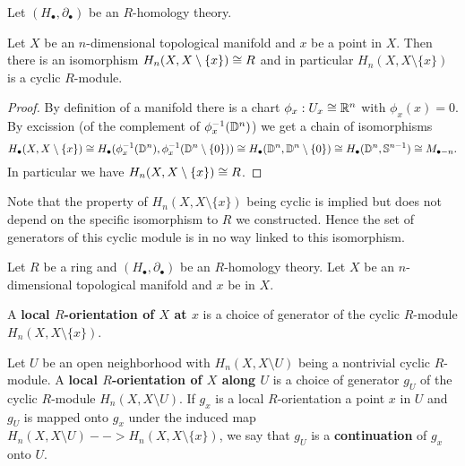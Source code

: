 	\begin{lemma}
		Let $(H_\bullet,\partial_\bullet)$ be an $R$-homology theory.

		Let $X$ be an $n$-dimensional topological manifold and $x$ be a point in $X$. Then there is an isomorphism $H_n(X,X\setminus \{x\}) \cong R$ and in particular $H_n(X,X\setminus \{x\})$ is a cyclic $R$-module.
	\end{lemma}
	\begin{proof}
		By definition of a manifold there is a chart $\phi_x: U_x \cong \mathbb{R}^n$ with $\phi_x(x) = 0$. By excission (of the complement of $\phi_x^{-1}(\mathbb{D}^n)$) we get a chain of isomorphisms
		\begin{equation*}
			H_\bullet(X,X\setminus\{x\}) \cong H_\bullet(\phi_x^{-1}(\mathbb{D}^n),\phi_x^{-1}(\mathbb{D}^n\setminus \{0\})) \cong H_\bullet(\mathbb{D}^n,\mathbb{D}^n\setminus \{0\}) \cong H_\bullet(\mathbb{D}^n,\mathbb{S}^{n-1}) \cong M_{\bullet-n}.
		\end{equation*}
		In particular we have $H_n(X,X\setminus\{x\}) \cong R$. 
	\end{proof}

	\begin{remark}
		Note that the property of $H_n(X,X\setminus \{x\})$ being cyclic is implied but does not depend on the specific isomorphism to $R$ we constructed. Hence the set of generators of this cyclic module is in no way linked to this isomorphism.
	\end{remark}

	\begin{definition}
		Let $R$ be a ring and $(H_\bullet, \partial_\bullet)$ be an $R$-homology theory. Let $X$ be an $n$-dimensional topological manifold and $x$ be in $X$. 

		A \textbf{local $R$-orientation of $X$ at $x$} is a choice of generator of the cyclic $R$-module $H_n(X,X\setminus\{x\})$.

		Let $U$ be an open neighborhood with $H_n(X,X\setminus U)$ being a nontrivial cyclic $R$-module. A \textbf{local $R$-orientation of $X$ along $U$} is a choice of generator $g_U$ of the cyclic $R$-module $H_n(X,X\setminus U)$. If $g_x$ is a local $R$-orientation a point $x$ in $U$ and $g_U$ is mapped onto $g_x$ under the induced map $H_n(X,X\setminus U) --> H_n(X,X\setminus \{x\})$, we say that $g_U$ is a \textbf{continuation} of $g_x$ onto $U$.
	\end{definition}

